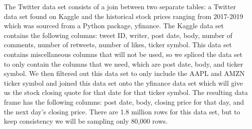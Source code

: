 \documentclass[conference]{IEEEtran}
\begin{document}
The Twitter data set consists of a join between two separate tables: a Twitter data set found on Kaggle and the historical stock prices ranging from 2017-2019 which was sourced from a Python package, yfinance. The Kaggle data set contains the following columns: tweet ID, writer, post date, body, number of comments, number of retweets, number of likes, ticker symbol. This data set contains miscellaneous columns that will not be used, so we spliced the data set to only contain the columns that we need, which are post date, body, and ticker symbol. We then filtered out this data set to only include the AAPL and AMZN ticker symbol and joined this data set onto the yfinance data set which will give us the stock closing quote for that date for that ticker symbol. The resulting data frame has the following columns: post date, body, closing price for that day, and the next day's closing price. There are 1.8 million rows for this data set, but to keep consistency we will be sampling only 80,000 rows.
\end{document}

